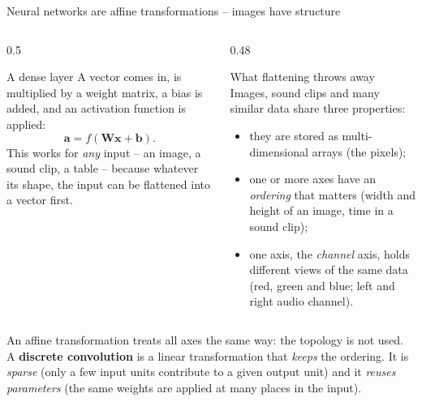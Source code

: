 \documentclass[10pt,aspectratio=169]{beamer}
\begin{document}
\begin{frame}{Neural networks are affine transformations -- images have structure}
\small
\begin{columns}[T]
\begin{column}{0.5\textwidth}
\begin{block}{A dense layer}
A vector comes in, is multiplied by a weight matrix, a bias is added, and
an activation function is applied:
\[
  \bm{a}=f(\bm{W}\bm{x}+\bm{b}).
\]
This works for \emph{any} input -- an image, a sound clip, a table --
because whatever its shape, the input can be flattened into a vector
first.
\end{block}
\end{column}
\begin{column}{0.48\textwidth}
\begin{block}{What flattening throws away}
Images, sound clips and many similar data share three properties:
\begin{itemize}
  \item they are stored as multi-dimensional arrays (the pixels);
  \item one or more axes have an \emph{ordering} that matters (width and
        height of an image, time in a sound clip);
  \item one axis, the \emph{channel} axis, holds different views of the
        same data (red, green and blue; left and right audio channel).
\end{itemize}
\end{block}
\end{column}
\end{columns}
\medskip
An affine transformation treats all axes the same way: the topology is not
used.  A \textbf{discrete convolution} is a linear transformation that
\emph{keeps} the ordering.  It is \emph{sparse} (only a few input units
contribute to a given output unit) and it \emph{reuses parameters} (the
same weights are applied at many places in the input).
\end{frame}
\end{document}
